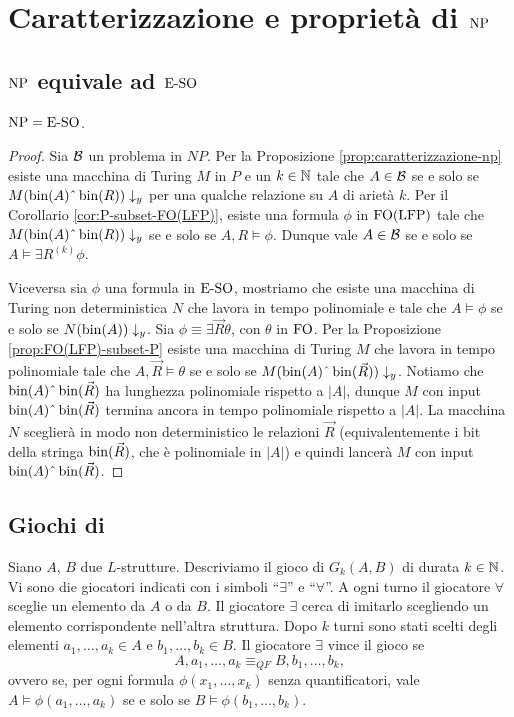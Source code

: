 \chapter{Caratterizzazione e proprietà di \texorpdfstring{$\operatorname{NP}$}{NP}}

\section{\texorpdfstring{$\operatorname{NP}$}{NP} equivale ad \texorpdfstring{$\operatorname{E-SO}$}{ESO}}

\begin{teorema}[Fagin]
  \label{thm:np-eso}
  $\operatorname{NP} = \operatorname{E-SO}$.
\end{teorema}
\begin{proof}
 Sia $\mathcal{B}$ un problema in $NP$. Per la Proposizione \ref{prop:caratterizzazione-np}
 esiste una macchina di Turing $M$ in $P$ e un $k \in \mathbb{N}$ tale che
 $A \in \mathcal{B}$ se e solo se $M(\bin(A)\string^\bin(R))\downarrow_y$ per una qualche
 relazione su $A$ di arietà $k$.
 Per il Corollario \ref{cor:P-subset-FO(LFP)}, esiste una formula $\phi$
 in $\operatorname{FO}(\operatorname{LFP})$ tale che $M(\bin(A)\string^\bin(R))\downarrow_y$ se e solo se
 $A,R \models \phi$. Dunque vale $A \in \mathcal{B}$ se e solo se
 $A \models \exists R^{(k)} \phi$.
 
 Viceversa sia $\phi$ una formula in $\operatorname{E-SO}$, mostriamo che esiste una macchina
 di Turing non deterministica $N$ che lavora in tempo polinomiale e
 tale che $A \models \phi$ se e solo se $N(\operatorname{bin}(A))\downarrow_y$.
 Sia $\phi \equiv \exists \vec{R} \theta$, con $\theta$ in $\operatorname{FO}$.
 Per la Proposizione \ref{prop:FO(LFP)-subset-P} esiste una macchina di Turing
 $M$ che lavora in tempo polinomiale tale che $A,\vec{R} \models \theta$
 se e solo se $M(\bin(A)\string^\bin(\vec{R}))\downarrow_y$.
 Notiamo che $\bin(A)\string^\bin(\vec{R})$ ha lunghezza polinomiale
 rispetto a $|A|$, dunque $M$ con input $\bin(A)\string^\bin(\vec{R})$ termina ancora
 in tempo polinomiale rispetto a $|A|$. La macchina $N$ sceglierà 
 in modo non deterministico le relazioni $\vec{R}$ (equivalentemente i bit
 della stringa $\operatorname{bin}(\vec{R})$, che è polinomiale in $|A|$) e quindi lancerà
 $M$ con input $\bin(A)\string^\bin(\vec{R})$.
\end{proof}


\section{Giochi di \EFl{}}
\begin{definizione}
 Siano $A$, $B$ due $L$-strutture. Descriviamo
 il gioco di \EFl{} $G_k(A,B)$ di durata $k \in \mathbb{N}$. Vi sono die giocatori
 indicati con i simboli ``$\exists$'' e ``$\forall$''. A ogni turno
 il giocatore $\forall$ sceglie un elemento da $A$ o da $B$. Il giocatore
 $\exists$ cerca di imitarlo scegliendo un elemento corrispondente nell'altra
 struttura. Dopo $k$ turni sono stati scelti degli elementi
 $a_1, \ldots, a_k \in A$ e $b_1, \ldots, b_k \in B$. Il giocatore $\exists$
 vince il gioco se
 \[ A, a_1, \ldots, a_k \equiv_{QF} B, b_1, \ldots, b_k,\]
 ovvero se, per ogni formula $\phi(x_1, \ldots, x_k)$ senza quantificatori, vale
 $A \models \phi(a_1, \ldots, a_k)$ se e solo se $B \models \phi(b_1, \ldots, b_k)$.
\end{definizione}

